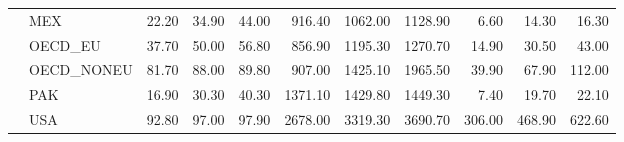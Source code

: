 \begin{table}
\begin{tabular}[t]{llrrrrrrrrr}
 & MEX & \num{22.20} & \num{34.90} & \num{44.00} & \num{916.40} & \num{1062.00} & \num{1128.90} & \num{6.60} & \num{14.30} & \num{16.30}\\
 & OECD\_EU & \num{37.70} & \num{50.00} & \num{56.80} & \num{856.90} & \num{1195.30} & \num{1270.70} & \num{14.90} & \num{30.50} & \num{43.00}\\
 & OECD\_NONEU & \num{81.70} & \num{88.00} & \num{89.80} & \num{907.00} & \num{1425.10} & \num{1965.50} & \num{39.90} & \num{67.90} & \num{112.00}\\
 & PAK & \num{16.90} & \num{30.30} & \num{40.30} & \num{1371.10} & \num{1429.80} & \num{1449.30} & \num{7.40} & \num{19.70} & \num{22.10}\\
 & USA & \num{92.80} & \num{97.00} & \num{97.90} & \num{2678.00} & \num{3319.30} & \num{3690.70} & \num{306.00} & \num{468.90} & \num{622.60}\\
\bottomrule
\end{tabular}
\end{table}
